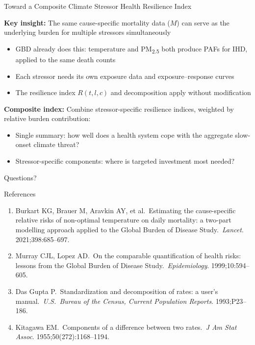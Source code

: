 \documentclass[aspectratio=169,10pt]{beamer}
\begin{document}
\begin{frame}{Toward a Composite Climate Stressor Health Resilience Index}

  \textbf{Key insight:} The same cause-specific mortality data ($M$) can serve as the underlying burden for multiple stressors simultaneously
  \begin{itemize}
    \item GBD already does this: temperature and PM\textsubscript{2.5} both produce PAFs for IHD, applied to the same death counts
    \item Each stressor needs its own exposure data and exposure--response curves
    \item The resilience index $R(t,l,c)$ and decomposition apply without modification
  \end{itemize}

  \vspace{0.5em}
  \textbf{Composite index:} Combine stressor-specific resilience indices, weighted by relative burden contribution:
  \begin{itemize}
    \item Single summary: how well does a health system cope with the aggregate slow-onset climate threat?
    \item Stressor-specific components: where is targeted investment most needed?
  \end{itemize}
\end{frame}

\begin{frame}[standout]
  Questions?
\end{frame}

\appendix

\begin{frame}{References}
  \small
  \begin{enumerate}
    \item Burkart KG, Brauer M, Aravkin AY, et al.\ Estimating the cause-specific relative risks of non-optimal temperature on daily mortality: a two-part modelling approach applied to the Global Burden of Disease Study.\ \textit{Lancet}. 2021;398:685--697.
    \item Murray CJL, Lopez AD.\ On the comparable quantification of health risks: lessons from the Global Burden of Disease Study.\ \textit{Epidemiology}. 1999;10:594--605.
    \item Das Gupta P.\ Standardization and decomposition of rates: a user's manual.\ \textit{U.S.\ Bureau of the Census, Current Population Reports}. 1993;P23--186.
    \item Kitagawa EM.\ Components of a difference between two rates.\ \textit{J Am Stat Assoc}. 1955;50(272):1168--1194.
  \end{enumerate}
\end{frame}
\end{document}
